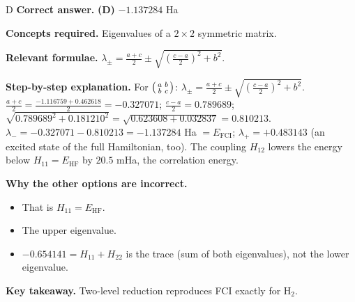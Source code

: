 \documentclass[11pt,a4paper]{article}
\newcommand{\qsep}{\par\vspace{2pt}{\color{black!15}\hrule}\vspace{4pt}}
\begin{document}
\begin{solbox}{D}
\textbf{\color{brand}Correct answer.} \textcolor{okgreen}{\textbf{(D)}} $-1.137284$ Ha

\textbf{\color{brand}Concepts required.} Eigenvalues of a $2\times2$ symmetric matrix.

\textbf{\color{brand}Relevant formulae.} $\lambda_\pm = \frac{a+c}{2} \pm \sqrt{\left(\frac{c-a}{2}\right)^2 + b^2}$.

\textbf{\color{brand}Step-by-step explanation.} For $\begin{psmallmatrix}a&b\\b&c\end{psmallmatrix}$: $\lambda_\pm = \frac{a+c}{2} \pm \sqrt{\left(\frac{c-a}{2}\right)^2 + b^2}$.
$\frac{a+c}{2} = \frac{-1.116759 + 0.462618}{2} = -0.327071$; $\frac{c-a}{2} = 0.789689$; $\sqrt{0.789689^2 + 0.181210^2} = \sqrt{0.623608 + 0.032837} = 0.810213$.
$\lambda_- = -0.327071 - 0.810213 = -1.137284$ Ha $= E_{\mathrm{FCI}}$; $\lambda_+ = +0.483143$ (an excited state of the full Hamiltonian, too).
The coupling $H_{12}$ lowers the energy below $H_{11} = E_{\mathrm{HF}}$ by $20.5$ mHa, the correlation energy.

\textbf{\color{brand}Why the other options are incorrect.}
\begin{itemize}[leftmargin=2.4em, itemsep=1pt, topsep=2pt]
\item[\textbf{(A)}] That is $H_{11} = E_{\mathrm{HF}}$.
\item[\textbf{(B)}] The upper eigenvalue.
\item[\textbf{(C)}] $-0.654141 = H_{11} + H_{22}$ is the trace (sum of both eigenvalues), not the lower eigenvalue.
\end{itemize}
\textbf{\color{brand}Key takeaway.} Two-level reduction reproduces FCI exactly for H$_2$.
\end{solbox}
\qsep
\end{document}
